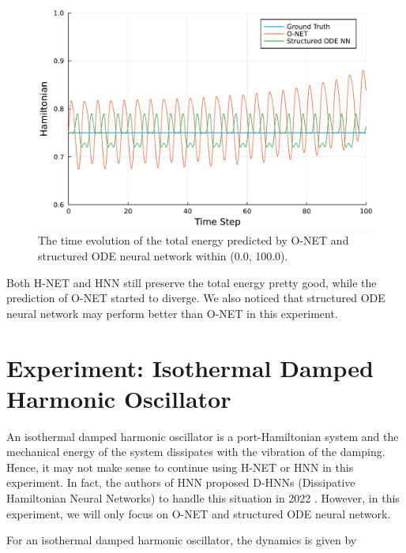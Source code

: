 \documentclass[
	parskip, 			   %
	twoside, 			   %
	DIV=14, 			   %
	BCOR=15.0mm, 		   %
	headsepline, 		   %
	open=right, 		   %
	captions=tableheading, %
	bibliography=totoc,    %
	numbers=noenddot       %
]{scrreprt}
\begin{document}
\clearpage
\begin{figure}[h!]
    \centering
    \includegraphics[scale=0.5]{figures/Hamiltonian_evolution_long_O_NET_and_structured_ODE_NN.pdf}
    \caption{The time evolution of the total energy predicted by O-NET and structured ODE neural network within (0.0, 100.0).}
    \label{fig:Hamiltonian_evolution_long_O_NET_and_structured_ODE_NN}
\end{figure}

Both H-NET and HNN still preserve the total energy pretty good, while the prediction of O-NET started to diverge. We also noticed that structured ODE neural network may perform better than O-NET in this experiment.


\clearpage
\section{Experiment: Isothermal Damped Harmonic Oscillator}
An isothermal damped harmonic oscillator is a port-Hamiltonian system and the mechanical energy of the system dissipates with the vibration of the damping. Hence, it may not make sense to continue using H-NET or HNN in this experiment. In fact, the authors of HNN proposed D-HNNs (Dissipative Hamiltonian Neural Networks) to handle this situation in 2022 \cite{greydanus2022dissipative}. However, in this experiment, we will only focus on O-NET and structured ODE neural network.

For an isothermal damped harmonic oscillator, the dynamics is given by
\end{document}
